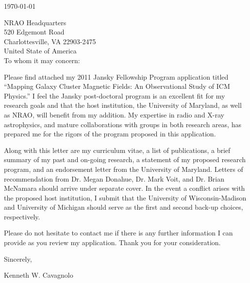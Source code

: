 \documentclass[letterpaper,12pt]{article}
\begin{document}
\today

NRAO Headquarters\\
520 Edgemont Road\\
Charlottesville, VA 22903-2475\\
United State of America\\

To whom it may concern:

Please find attached my 2011 Jansky Fellowship Program application
titled ``Mapping Galaxy Cluster Magnetic Fields: An Observational
Study of ICM Physics.'' I feel the Jansky post-doctoral program is an
excellent fit for my research goals and that the host institution, the
University of Maryland, as well as NRAO, will benefit from my
addition. My expertise in radio and X-ray astrophysics, and mature
collaborations with groups in both research areas, has prepared me for
the rigors of the program proposed in this application.

Along with this letter are my curriculum vitae, a list of
publications, a brief summary of my past and on-going research, a
statement of my proposed research program, and an endorsement letter
from the University of Maryland. Letters of recommendation from
Dr. Megan Donahue, Dr. Mark Voit, and Dr. Brian McNamara should arrive
under separate cover. In the event a conflict arises with the proposed
host institution, I submit that the University of Wisconsin-Madison
and University of Michigan should serve as the first and second
back-up choices, respectively.

Please do not hesitate to contact me if there is any further
information I can provide as you review my application. Thank you for
your consideration.

Sincerely,\\
\begin{minipage}{7.5in}
\end{minipage}
Kenneth W. Cavagnolo
\end{document}
